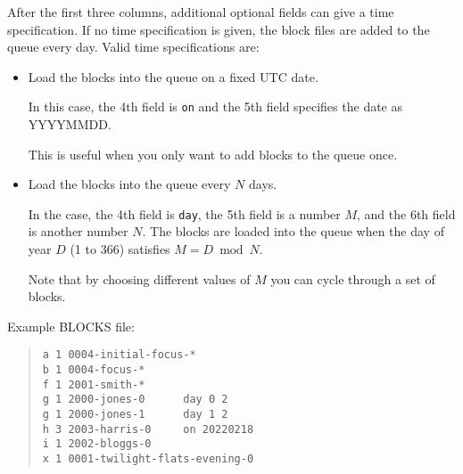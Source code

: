 After the first three columns, additional optional fields can give a time specification. If no time specification is given, the block files are added to the queue
every day. Valid time specifications are:

\begin{itemize}
    \item Load the blocks into the queue on a fixed UTC date. 
    
    In this case, the 4th field is \verb|on| and the 5th field specifies the date as YYYYMMDD.
    
    This is useful when you only want to add blocks to the queue once.
    
    \item Load the blocks into the queue every $N$ days. 
    
    In the case, the 4th field is \verb|day|, the 5th field is a number $M$, and the 6th field is another number $N$. The blocks are loaded into the queue when the day of year $D$ (1 to 366) satisfies $M = D \bmod N$.
    
    Note that by choosing different values of $M$ you can cycle through a set of blocks.
    
\end{itemize}

Example BLOCKS file:

\begin{quote}
\begin{verbatim}
a 1 0004-initial-focus-*
b 1 0004-focus-*
f 1 2001-smith-*
g 1 2000-jones-0      day 0 2
g 1 2000-jones-1      day 1 2
h 3 2003-harris-0     on 20220218
i 1 2002-bloggs-0
x 1 0001-twilight-flats-evening-0
\end{verbatim}
\end{quote}
